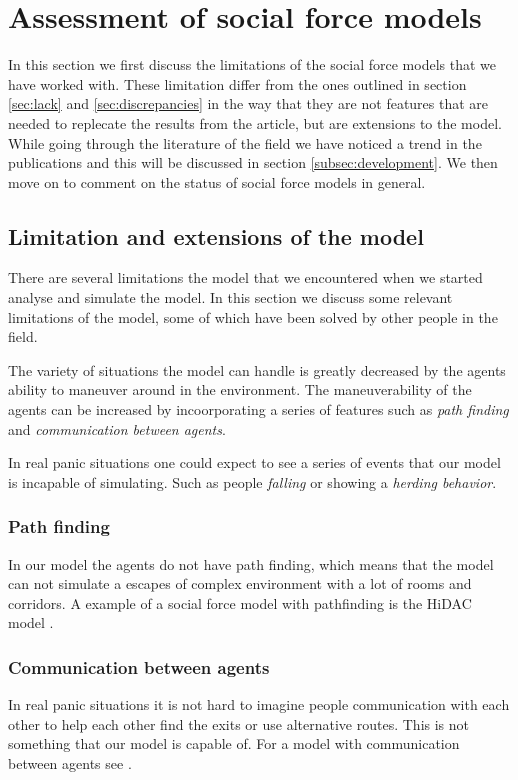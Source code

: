 \section{Assessment of social force models}
\label{sec:assessment}
In this section we first discuss the limitations of the social force models 
that we have worked with. These limitation differ from the ones outlined in 
section \ref{sec:lack} and \ref{sec:discrepancies} in the way that 
they are not features that are needed to replecate the results from the article, 
but are extensions to the model. 
While going through the literature of the field we have noticed a trend in the 
publications and this will be discussed in section \ref{subsec:development}. 
We then move on to comment on the status of social force models in general.

\subsection{Limitation and extensions of the model}
There are several limitations the model that we encountered when we started 
analyse and simulate the model. In this section we discuss some relevant 
limitations of the model, some of which have been solved by other people in the 
field. 

The variety of situations the model can handle is greatly decreased by the 
agents ability to maneuver around in the environment. The maneuverability of 
the agents can be increased by incoorporating a series of features such as 
\emph{path finding} and \emph{communication between agents}. 

In real panic situations one could expect to see a series of events that our 
model is incapable of simulating. Such as people \emph{falling} or showing a 
\emph{herding behavior}.

\subsubsection{Path finding}
In our model the agents do not have path finding, which means that the model 
can not simulate a escapes of complex environment with a lot of rooms 
and corridors. A example of a social force model with pathfinding is the HiDAC 
model \cite{HiDAC}.

\subsubsection{Communication between agents}
In real panic situations it is not hard to imagine people communication with 
each other to help each other find the exits or use alternative routes. This is 
not something that our model is capable of. For a model with communication between 
agents see \cite{HiDAC}.

